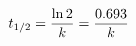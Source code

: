 \documentclass[preview]{standalone}
\begin{document}
\begin{align*}
\special{dvisvgm:raw <g id='unique000'>}t_{1/2} = \frac{\ln 2}{k} = \frac{0.693}{k}\special{dvisvgm:raw </g>}
\end{align*}
\end{document}
